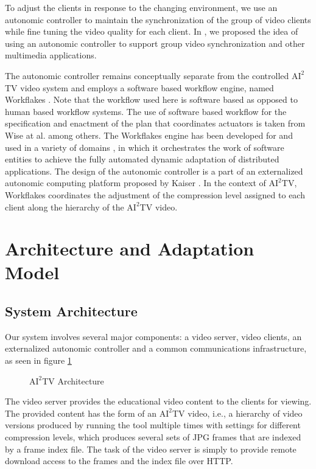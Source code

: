\documentclass{sig-alternate}
\begin{document}
To adjust the clients in response to the changing environment, we use
an autonomic controller to maintain the synchronization of the group
of video clients while fine tuning the video quality for each client.
In \cite{RAVAGES}, we proposed the idea of using an autonomic
controller to support group video synchronization and other multimedia
applications.

The autonomic controller remains conceptually separate from the
controlled $\mathrm{AI}^2$TV video system and employs a software based
workflow engine, named Workflakes \cite{ICSE}.  Note that the workflow
used here is software based as opposed to human based workflow
systems.  The use of software based workflow for the specification and
enactment of the plan that coordinates actuators is taken from Wise at
al. \cite{OSTERWEIL} among others.  The Workflakes engine has been
developed for and used in a variety of domains \cite{AMS,ICSE}, in
which it orchestrates the work of software entities to achieve the
fully automated dynamic adaptation of distributed applications.  The
design of the autonomic controller is a part of an externalized
autonomic computing platform proposed by Kaiser \cite{REFARCH}.  In
the context of $\mathrm{AI}^2$TV, Workflakes coordinates the
adjustment of the compression level assigned to each client along the
hierarchy of the $\mathrm{AI}^2$TV video.


\section{Architecture and Adaptation\\ Model}
\subsection{System Architecture}
Our system involves several major components: a video server, video
clients, an externalized autonomic controller and a common
communications infrastructure, as seen in figure \ref{ai2tv_arch}

\begin{figure}
  \centering
  \caption{$\mathrm{AI}^2$TV Architecture}
  \label{ai2tv_arch}
\end{figure}

The video server provides the educational video content to the clients
for viewing.  The provided content has the form of an
$\mathrm{AI}^2$TV video, i.e., a hierarchy of video versions produced
by running the tool multiple times with settings for different
compression levels, which produces several sets of JPG frames that are
indexed by a frame index file.  The task of the video server is simply
to provide remote download access to the frames and the index file
over HTTP.
\end{document}
